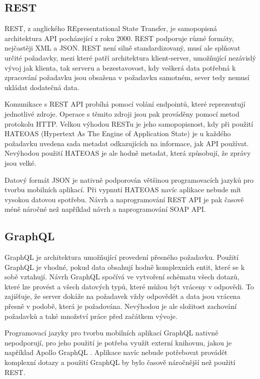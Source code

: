 \subsection{REST}

REST, z anglického REpresentational State Transfer, je samopopisná architektura API pocháze\-jící z roku 2000. REST podporuje různé formáty, nejčastěji XML a JSON. REST není silně standardizovaný, musí ale splňovat určité požadavky, mezi které patří architektura klient-server, umožňující nezávislý vývoj jak klienta, tak serveru a bezestavovost, kdy veškerá data potřebná k zpracování požadavku jsou obsažena v požadavku samotném, sever tedy nemusí ukládat dodatečná data.

Komunikace s REST API probíhá pomocí volání endpointů, které reprezentují jednotlivé zdroje. Operace s těmito zdroji jsou pak prováděny pomocí metod protokolu HTTP. Velkou výhodou RESTu je jeho samopopisnost, kdy při použití HATEOAS (Hypertext As The Engine of Application State) je u každého požadavku uvedena sada metadat odkazujících na informace, jak API používat. Nevýhodou použití HATEOAS je ale hodně metadat, která způsobují, že zprávy jsou velké. \cite{altexsoft}

Datový formát JSON je nativně podporován většinou programovacích jazyků pro tvorbu mobilních aplikací. Při vypnutí HATEOAS navíc aplikace nebude mít vysokou datovou spotřebu. Návrh a naprogramování REST API je pak časově méně náročné než například návrh a naprogramování SOAP API.

\subsection{GraphQL}

GraphQL \cite{graphql} je architektura umožňující provedení přesného požadavku. Použití GraphQL je vhodné, pokud data obsahují hodně komplexních entit, které se k sobě vztahují. Návrh GraphQL spočívá ve vytvoření schématu všech dotazů, které lze provést a všech datových typů, které můžou být vráceny v odpovědi. To zajišťuje, že server dokáže na požadavek vždy odpovědět a data jsou vrácena přesně v podobě, která je požadována. Nevýhodou je ale složitost zachování požadavků a také množství práce před začátkem vývoje. \cite{altexsoft}

Programovací jazyky pro tvorbu mobilních aplikací GraphQL nativně nepodporují, pro jeho použití je potřeba využít externí knihovnu, jakou je například Apollo GraphQL \cite{apollo-graphql}. Aplikace navíc nebude potřebovat provádět komplexní dotazy a použití GraphQL by bylo časově náročnější než použití REST.

